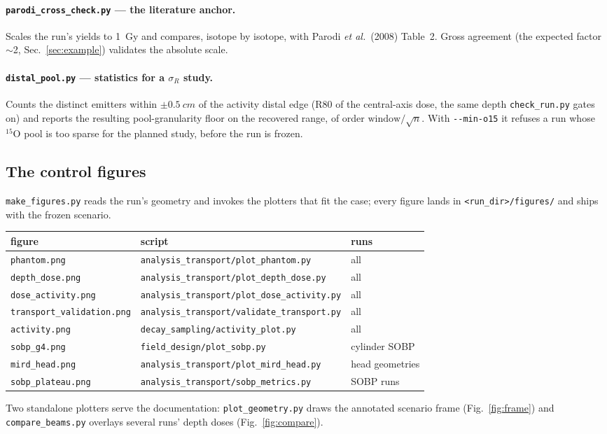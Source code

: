 \documentclass[11pt]{article}
\newcommand{\Ox}[1]{{}^{#1}\mathrm{O}}
\newcommand{\file}[1]{\texttt{#1}}
\begin{document}
\paragraph{\file{parodi\_cross\_check.py} --- the literature anchor.} Scales
the run's yields to \SI{1}{Gy} and compares, isotope by isotope, with Parodi
\emph{et al.}\ (2008) Table~2. Gross agreement (the expected factor
$\sim$2, Sec.~\ref{sec:example}) validates the absolute scale.

\paragraph{\file{distal\_pool.py} --- statistics for a $\sigma_R$ study.}
Counts the distinct emitters within $\pm\SI{0.5}{cm}$ of the activity distal
edge (R80 of the central-axis dose, the same depth \file{check\_run.py} gates
on) and reports the resulting pool-granularity floor on the recovered range,
of order $\text{window}/\sqrt{n}$. With \file{-{}-min-o15} it refuses a run
whose $\Ox{15}$ pool is too sparse for the planned study, before the run is
frozen.

\subsection{The control figures}
\file{make\_figures.py} reads the run's geometry and invokes the plotters that
fit the case; every figure lands in \file{<run\_dir>/figures/} and ships with
the frozen scenario.
\begin{center}
\begin{tabular}{@{}lll@{}}
\toprule
figure & script & runs \\
\midrule
\file{phantom.png} & \file{analysis\_transport/plot\_phantom.py} & all \\
\file{depth\_dose.png} & \file{analysis\_transport/plot\_depth\_dose.py} & all \\
\file{dose\_activity.png} & \file{analysis\_transport/plot\_dose\_activity.py} & all \\
\file{transport\_validation.png} & \file{analysis\_transport/validate\_transport.py} & all \\
\file{activity.png} & \file{decay\_sampling/activity\_plot.py} & all \\
\file{sobp\_g4.png} & \file{field\_design/plot\_sobp.py} & cylinder SOBP \\
\file{mird\_head.png} & \file{analysis\_transport/plot\_mird\_head.py} & head geometries \\
\file{sobp\_plateau.png} & \file{analysis\_transport/sobp\_metrics.py} & SOBP runs \\
\bottomrule
\end{tabular}
\end{center}
Two standalone plotters serve the documentation: \file{plot\_geometry.py}
draws the annotated scenario frame (Fig.~\ref{fig:frame}) and
\file{compare\_beams.py} overlays several runs' depth doses
(Fig.~\ref{fig:compare}).
\end{document}
